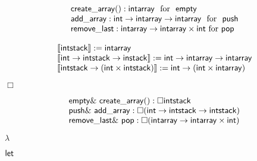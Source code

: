 \documentclass[10pt]{book}
\begin{document}
\begin{mdSnippets}
\begin{mdDisplaySnippet}[0e8f9bfe4d65c71c645a8b474e5916bc]%
\[%
\begin{array}{l}
{ \sf create\_array(): intarray} \ \  \text{for}\ \ {\sf empty}\\
  {\sf add\_array: int \rightarrow intarray\rightarrow intarray}\ \  \text{for} \ \ {\sf push}\\
{\sf remove\_last: intarray\rightarrow intarray\times int }\  \text{for}\  {\sf pop}
\end{array}
\]%
\end{mdDisplaySnippet}%
\begin{mdDisplaySnippet}[97210db0216d148c80d2a671ff4f1a84]%
\[%
  \begin{array}{l}
  \llbracket {\sf intstack} \rrbracket:= {\sf intarray} \\  
  \llbracket {\sf int \rightarrow intstack\rightarrow instack } \rrbracket:= {\sf int \rightarrow intarray\rightarrow intarray} \\
  \llbracket {\sf intstack \rightarrow (int \times intstack)} \rrbracket:= {\sf int\rightarrow (int\times intarray)}\\
  \end{array}
\]%
\end{mdDisplaySnippet}%
\begin{mdInlineSnippet}[c3880bc63c2b0fd10cdc024cf76a1924]%
$\Box$\end{mdInlineSnippet}%
\begin{mdDisplaySnippet}[412a58d8f7e4f7924cc15a8c07c67c1d]%
\[%
  \begin{array}{l}
  { \sf empty \& \  create\_array():\Box intstack} \\
    {\sf  push \&\  add\_array  :\Box (int \rightarrow intstack\rightarrow intstack)}\\
  {\sf remove\_last \&\  pop: \Box (intarray\rightarrow intarray\times int)}
  \end{array}
\]%
\end{mdDisplaySnippet}%
\begin{mdInlineSnippet}[c6a6eb61fd9c6c913da73b3642ca147d]%
$\lambda$\end{mdInlineSnippet}%
\begin{mdInlineSnippet}[0dd9ba8209181a52091dcd102fc1c48d]%
${\sf let}$\end{mdInlineSnippet}%

\end{mdSnippets}
\end{document}
